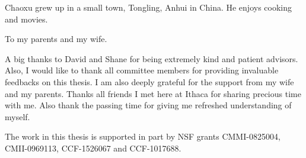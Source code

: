 \documentclass[phd,tocprelim]{cornell}
\begin{document}
\begin{biosketch}
Chaoxu grew up in a small town, Tongling, Anhui in China. He enjoys cooking and movies.
\end{biosketch}

\begin{dedication}
To my parents and my wife.
\end{dedication}

\begin{acknowledgements}
A big thanks to David and Shane for being extremely kind and patient advisors.
Also, I would like to thank all committee members for providing
invaluable feedbacks on this thesis.
I am also deeply grateful for the support from my wife and my parents.
Thanks all friends I met here at Ithaca for sharing precious time with me.
Also thank the passing time for giving me refreshed understanding of myself.

The work in this thesis is supported in part by NSF grants CMMI-0825004,
CMII-0969113, CCF-1526067 and CCF-1017688.
\end{acknowledgements}

\contentspage
\tablelistpage
\figurelistpage

\normalspacing \setcounter{page}{1} 
\pagestyle{cornell} \addtolength{\parskip}{0.5\baselineskip}




%
%


\end{document}
